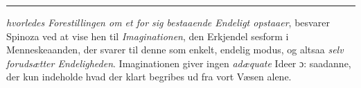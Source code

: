 \documentclass[12pt,a4paper]{book}
\newcommand{\divrule}{\begin{center}\rule{2cm}{0.4pt}\end{center}}
\begin{document}
\divrule

\emph{hvorledes Forestillingen
om et for sig bestaaende Endeligt opstaaer}, besvarer
Spinoza ved at vise hen til \emph{Imaginationen}, den Erkjendel\-%
sesform i Menneskeaanden, der svarer til denne som enkelt,
endelig modus, og altsaa \emph{selv forudsætter Endeligheden}.
Imaginationen giver ingen \emph{adæquate} Ideer ɔ: saadanne, der
kun indeholde hvad der klart begribes ud fra vort Væsen alene.
\end{document}
